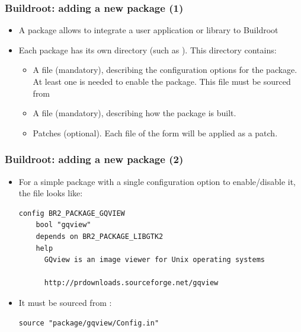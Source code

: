 \begin{frame}
  \frametitle{Buildroot: adding a new package (1)}
  \begin{itemize}
  \item A package allows to integrate a user application or library to
    Buildroot
  \item Each package has its own directory (such as
    ). This directory contains:
    \begin{itemize}
    \item A  file (mandatory), describing the
      configuration options for the package. At least one is needed to
      enable the package. This file must be sourced from
    \item A  file (mandatory), describing how the
      package is built.
    \item Patches (optional). Each file of the form
       will be applied as a patch.
    \end{itemize}
  \end{itemize}
\end{frame}

\begin{frame}[fragile]
  \frametitle{Buildroot: adding a new package (2)}
  \begin{itemize}
  \item For a simple package with a single configuration option to
    enable/disable it, the  file looks like:
\small
\begin{block}{}
\begin{verbatim}
config BR2_PACKAGE_GQVIEW
	bool "gqview"
	depends on BR2_PACKAGE_LIBGTK2
	help
	  GQview is an image viewer for Unix operating systems

	  http://prdownloads.sourceforge.net/gqview
\end{verbatim}
\end{block}
\normalsize
  \item It must be sourced from :
\small
\begin{block}{}
\begin{verbatim}
source "package/gqview/Config.in"
\end{verbatim}
\end{block}
  \end{itemize}
\end{frame}

